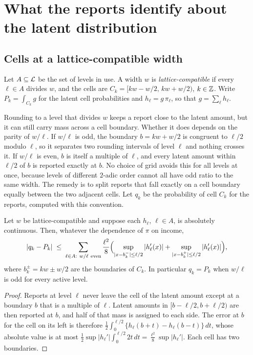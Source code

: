 \section{What the reports identify about the latent distribution}\label{sec:resolution}

\subsection{Cells at a lattice-compatible width}

Let $A\subseteq\mathcal{L}$ be the set of levels in use. A width $w$ is \emph{lattice-compatible} if every $\ell\in A$ divides $w$, and the cells are $C_k=[kw-w/2,\,kw+w/2)$, $k\in\mathbb{Z}$. Write $P_k=\int_{C_k}g$ for the latent cell probabilities and $h_\ell=g\,\pi_\ell$, so that $g=\sum_\ell h_\ell$.

Rounding to a level that divides $w$ keeps a report close to the latent amount, but it can still carry mass across a cell boundary. Whether it does depends on the parity of $w/\ell$. If $w/\ell$ is odd, the boundary $b=kw+w/2$ is congruent to $\ell/2$ modulo $\ell$, so it separates two rounding intervals of level $\ell$ and nothing crosses it. If $w/\ell$ is even, $b$ is itself a multiple of $\ell$, and every latent amount within $\ell/2$ of $b$ is reported exactly at $b$. No choice of grid avoids this for all levels at once, because levels of different $2$-adic order cannot all have odd ratio to the same width. The remedy is to split reports that fall exactly on a cell boundary equally between the two adjacent cells. Let $q_k$ be the probability of cell $C_k$ for the reports, computed with this convention.

\begin{lemma}\label{lem:split}
Let $w$ be lattice-compatible and suppose each $h_\ell$, $\ell\in A$, is absolutely continuous. Then, whatever the dependence of $\pi$ on income,
\[
|q_k-P_k|\;\le\;\sum_{\ell\in A:\ w/\ell\ \mathrm{even}}\frac{\ell^2}{8}\Bigl(\sup_{|x-b_k^-|\le\ell/2}|h_\ell'(x)|+\sup_{|x-b_k^+|\le\ell/2}|h_\ell'(x)|\Bigr),
\]
where $b_k^\pm=kw\pm w/2$ are the boundaries of $C_k$. In particular $q_k=P_k$ when $w/\ell$ is odd for every active level.
\end{lemma}

\begin{proof}
Reports at level $\ell$ never leave the cell of the latent amount except at a boundary $b$ that is a multiple of $\ell$. Latent amounts in $[b-\ell/2,b+\ell/2)$ are then reported at $b$, and half of that mass is assigned to each side. The error at $b$ for the cell on its left is therefore $\tfrac12\int_0^{\ell/2}\{h_\ell(b+t)-h_\ell(b-t)\}\,dt$, whose absolute value is at most $\tfrac12\sup|h_\ell'|\int_0^{\ell/2}2t\,dt=\tfrac{\ell^2}{8}\sup|h_\ell'|$. Each cell has two boundaries.
\end{proof}

